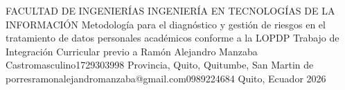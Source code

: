 \documentclass[12pt,a4paper,oneside]{report}
\begin{document}
{FACULTAD DE INGENIERÍAS} %
{INGENIERÍA EN TECNOLOGÍAS DE LA INFORMACIÓN} %
{Metodología para el diagnóstico y gestión de riesgos en el tratamiento de datos personales académicos conforme a la LOPDP} %
{Trabajo de Integración Curricular previo a \UTIFraseTituloPortada} %
{\UTIDatosAutores
  {Ramón Alejandro Manzaba Castro}{masculino}{1729303998}
  {Provincia, Quito, Quitumbe, San Martin de porres}{ramonalejandromanzaba@gmail.com}{0989224684}}
{} %
{Quito, Ecuador} %
{2026} %

\UTIFrontMatter


















\UTIMainMatter
\end{document}
